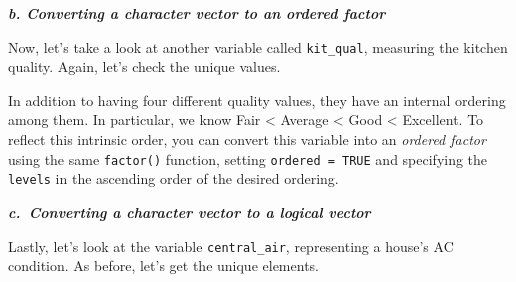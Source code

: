\documentclass[
]{book}
\newenvironment{Shaded}{\begin{snugshade}}{\end{snugshade}}
\newcommand{\AttributeTok}[1]{\textcolor[rgb]{0.77,0.63,0.00}{#1}}
\newcommand{\CommentTok}[1]{\textcolor[rgb]{0.56,0.35,0.01}{\textit{#1}}}
\newcommand{\ConstantTok}[1]{\textcolor[rgb]{0.00,0.00,0.00}{#1}}
\newcommand{\FunctionTok}[1]{\textcolor[rgb]{0.00,0.00,0.00}{#1}}
\newcommand{\NormalTok}[1]{#1}
\newcommand{\OtherTok}[1]{\textcolor[rgb]{0.56,0.35,0.01}{#1}}
\newcommand{\SpecialCharTok}[1]{\textcolor[rgb]{0.00,0.00,0.00}{#1}}
\newcommand{\StringTok}[1]{\textcolor[rgb]{0.31,0.60,0.02}{#1}}
\begin{document}
\textbf{\emph{b. Converting a character vector to an ordered factor}}

Now, let's take a look at another variable called \texttt{kit\_qual}, measuring the kitchen quality. Again, let's check the unique values.

\begin{Shaded}
\end{Shaded}

In addition to having four different quality values, they have an internal ordering among them. In particular, we know Fair \textless{} Average \textless{} Good \textless{} Excellent. To reflect this intrinsic order, you can convert this variable into an \emph{ordered factor} using the same \texttt{factor()} function, setting \texttt{ordered\ =\ TRUE} and specifying the \texttt{levels} in the ascending order of the desired ordering.

\begin{Shaded}
\end{Shaded}

\textbf{\emph{c.~Converting a character vector to a logical vector}}

Lastly, let's look at the variable \texttt{central\_air}, representing a house's AC condition. As before, let's get the unique elements.

\begin{Shaded}
\end{Shaded}
\end{document}
